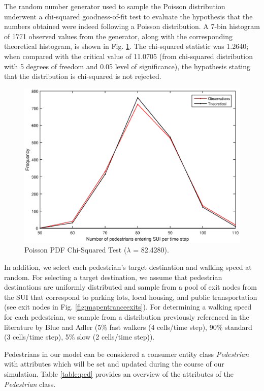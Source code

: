 \documentclass[12pt]{article}
\begin{document}
The random number generator used to sample the Poisson distribution underwent a
chi-squared goodness-of-fit test to evaluate the hypothesis that the numbers obtained
were indeed following a Poisson distribution. A 7-bin histogram of 1771 observed
values from the generator, along with the corresponding theoretical histogram,
is shown in Fig. \ref{fig:poissoncompare}. The chi-squared statistic was 1.2640;
when compared with the critical value of 11.0705 (from chi-squared distribution
with 5 degrees of freedom and 0.05 level of significance), the hypothesis
stating that the distribution is chi-squared is not rejected.

\begin{figure}[H]
  \includegraphics[width=\linewidth,natwidth=811,natheight=512]{PoissonCompare.eps}
  \caption{Poisson PDF Chi-Squared Test ($\lambda$ = 82.4280).}
  \label{fig:poissoncompare}
\end{figure}

In addition, we select each pedestrian's target destination and walking
speed at random. For selecting a target destination, we assume that pedestrian
destinations are uniformly distributed and sample from a pool of exit nodes
from the SUI that correspond to parking lots, local housing, and public
transportation (see exit nodes in Fig. \ref{fig:mapentranceexits}). For
determining a walking speed for each pedestrian, we sample from a distribution
previously referenced in the literature by Blue and Adler
\cite{blue2001cellular} (5\% fast walkers (4 cells/time step), 90\% standard
(3 cells/time step), 5\% slow (2 cells/time step)).

Pedestrians in our model can be considered a consumer entity class
\textit{Pedestrian} with attributes which will be set and updated during the
course of our simulation. Table \ref{table:ped} provides an overview of the
attributes of the \textit{Pedestrian} class.
\end{document}
